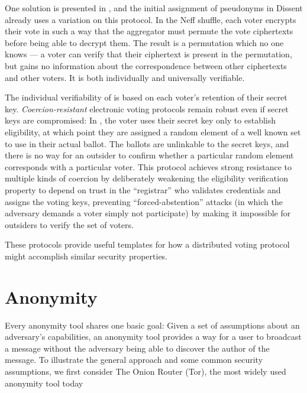     One solution is presented in \cite{neff_verifiable_2001},
    and the initial assignment of pseudonyms in Dissent already uses a variation
    on this protocol. In the Neff shuffle, each voter encrypts their vote in
    such a way that the aggregator must permute the vote ciphertexts before
    being able to decrypt them. The result is a permutation which no one knows
    --- a voter can verify that their ciphertext is present in the permutation,
    but gains no information about the correspondence between other ciphertexts
    and other voters. It is both individually and universally verifiable.

    The individual verifiability of \cite{neff_verifiable_2001} is based on each
    voter's retention of their secret key. \emph{Coercion-resistant} electronic
    voting protocols remain robust even if secret keys are compromised: In
    \cite{juels_coercion-resistant_2005}, the voter uses their secret key only
    to establish eligibility, at which point they are assigned a random element
    of a well known set to use in their actual ballot. The ballots are
    unlinkable to the secret keys, and there is no way for an outsider to
    confirm whether a particular random element corresponds with a particular
    voter. This protocol achieves strong resistance to multiple kinds of
    coercion by deliberately weakening the eligibility verification property to
    depend on trust in the ``registrar'' who validates credentials and assigns the
    voting keys, preventing ``forced-abstention'' attacks (in which the adversary
    demands a voter simply not participate) by making it impossible for
    outsiders to verify the set of voters.

    These protocols provide useful templates for how a distributed voting
    protocol might accomplish similar security properties.


\section{Anonymity}
\label{subsection:ExistingAnonymity}
  Every anonymity tool shares one basic goal: Given a set of assumptions about
  an adversary's capabilities, an anonymity tool provides a way for a user to
  broadcast a message without the adversary being able to discover the author of
  the message.
  To illustrate the general approach and some common security assumptions, we
  first consider The Onion Router (Tor), the most widely used anonymity tool
  today\cite{ford_hiding_2014}

